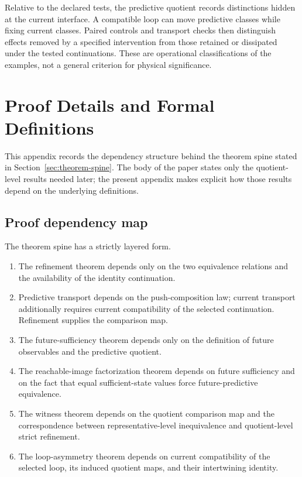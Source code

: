 \documentclass[11pt]{article}
\theoremstyle{definition}
\begin{document}
Relative to the declared tests, the predictive quotient records distinctions hidden at the current interface. A compatible loop can move predictive classes while fixing current classes. Paired controls and transport checks then distinguish effects removed by a specified intervention from those retained or dissipated under the tested continuations. These are operational classifications of the examples, not a general criterion for physical significance.

\appendix

\section{Proof Details and Formal Definitions}\label{app:proof-details}
This appendix records the dependency structure behind the theorem spine stated in Section~\ref{sec:theorem-spine}. The body of the paper states only the quotient-level results needed later; the present appendix makes explicit how those results depend on the underlying definitions.

\subsection{Proof dependency map}\label{appsubsec:proof-dependency-map}
The theorem spine has a strictly layered form.
\begin{enumerate}
\item The refinement theorem depends only on the two equivalence relations and the availability of the identity continuation.
\item Predictive transport depends on the push-composition law; current transport additionally requires current compatibility of the selected continuation. Refinement supplies the comparison map.
\item The future-sufficiency theorem depends only on the definition of future observables and the predictive quotient.
\item The reachable-image factorization theorem depends on future sufficiency and on the fact that equal sufficient-state values force future-predictive equivalence.
\item The witness theorem depends on the quotient comparison map and the correspondence between representative-level inequivalence and quotient-level strict refinement.
\item The loop-asymmetry theorem depends on current compatibility of the selected loop, its induced quotient maps, and their intertwining identity.
\end{enumerate}
\end{document}
